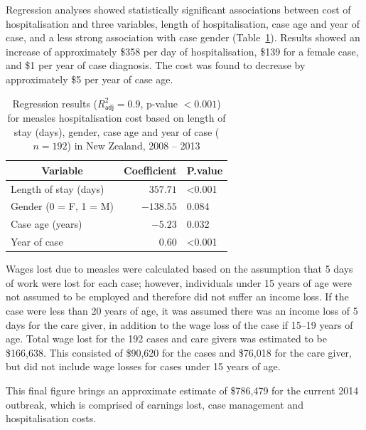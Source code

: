 \documentclass{article}
\begin{document}
{Regression analyses showed statistically significant associations between cost of hospitalisation and three variables, length of hospitalisation, case age and year of case, and a less strong association with case gender (Table~\ref{table:regression}). Results showed an increase of approximately \$358 per day of hospitalisation, \$139 for a female case, and \$1 per year of case diagnosis. The cost was found to decrease by approximately \$5 per year of case age.


\begin{table}
\caption{Regression results ($R^{2}_\textsf{adj} = 0.9$, p-value $<0.001$) for measles hospitalisation cost based on length of stay (days), gender, case age and year of case ($n=192$) in New Zealand, 2008 -- 2013}
\begin{center}
\begin{tabular}{lrl}
\hline\hline
\multicolumn{1}{c}{Variable}&\multicolumn{1}{c}{Coefficient}&\multicolumn{1}{c}{P.value}\tabularnewline
\hline
Length of stay (days)&$ 357.71$&\textless  0.001\tabularnewline
Gender (0 = F, 1 = M)&$-138.55$&0.084\tabularnewline
Case age (years)&$  -5.23$&0.032\tabularnewline
Year of case&$   0.60$&\textless  0.001\tabularnewline
\hline
\end{tabular}\end{center}\label{table:regression}
\end{table}

Wages lost due to measles were calculated based on the assumption that 5 days of work were lost for each case; however, individuals under 15 years of age were not assumed to be employed and therefore did not suffer an income loss. If the case were less than 20 years of age, it was assumed there was an income loss of 5 days for the care giver, in addition to the wage loss of the case if 15--19 years of age. Total wage lost for the 192 cases and care givers was estimated to be \$166,638. This consisted of \$90,620 for the cases and \$76,018 for the care giver, but did not include wage losses for cases under 15 years of age.

This final figure brings an approximate estimate of \$786,479 for the current 2014 outbreak, which is comprised of earnings lost, case management and hospitalisation costs.

}
\end{document}
